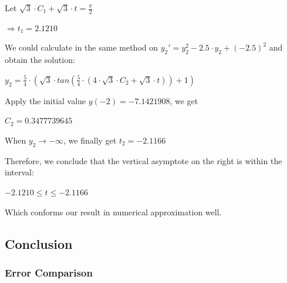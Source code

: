 \documentclass[11pt,a4paper]{article}
\begin{document}
	\begin{center}
		Let $\sqrt{3} \cdot C_1+\sqrt{3} \cdot t=\frac{\pi}{2}$

		$\Rightarrow t_1 = 2.1210$
	\end{center}

	We could calculate in the same method on $y_2' = y_2 ^ 2-2.5 \cdot y_2+(-2.5)^2$ and obtain the solution:

	\begin{center}
		$y_2=\frac{5}{4} \cdot (\sqrt{3} \cdot tan(\frac{5}{4} \cdot (4 \cdot \sqrt{3} \cdot C_2+\sqrt{3} \cdot t))+1)$
	\end{center}

	 Apply the initial value $y(-2) = -7.1421908$, we get 
	\begin{center}
		$C_2 = 0.3477739645$
	\end{center}

	When $y_2 \rightarrow -\infty$, we finally get $t_2=-2.1166$

	Therefore, we conclude that the vertical asymptote on the right is within the interval:

	\begin{center}
		$-2.1210 \leq t \leq -2.1166$
	\end{center}

	Which conforms our result in numerical approximation well.

\subsection{Conclusion}

\subsubsection{Error Comparison}
 
\end{document}
